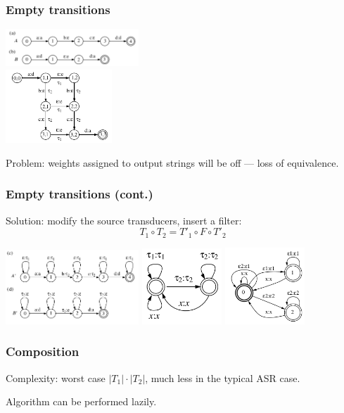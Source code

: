 \documentclass{beamer}
\newcommand{\<}{\langle}
\renewcommand{\>}{\rangle}
\begin{document}
\begin{frame}
  \frametitle{Empty transitions}

  \includegraphics[width=5cm]{composition-example-1.png}\\
  \includegraphics[width=4cm]{composition-example-2.png}

  Problem: weights assigned to output strings will be off --- loss of
  equivalence.
\end{frame}
\begin{frame}
  \frametitle{Empty transitions (cont.)}

  Solution: modify the source transducers, insert a filter:
  $$
  T_1 \circ T_2 = T'_1 \circ F \circ T'_2
  $$

  \includegraphics[width=5cm]{composition-example-3.png}
  \includegraphics[width=3cm]{composition-example-4.png}
  \includegraphics[width=3cm]{composition-example-5.png}
\end{frame}

\begin{frame}
  \frametitle{Composition}

  Complexity: worst case $|T_1| \cdot |T_2|$, much less in the typical
  ASR case.

  Algorithm can be performed lazily.
\end{frame}
\end{document}
